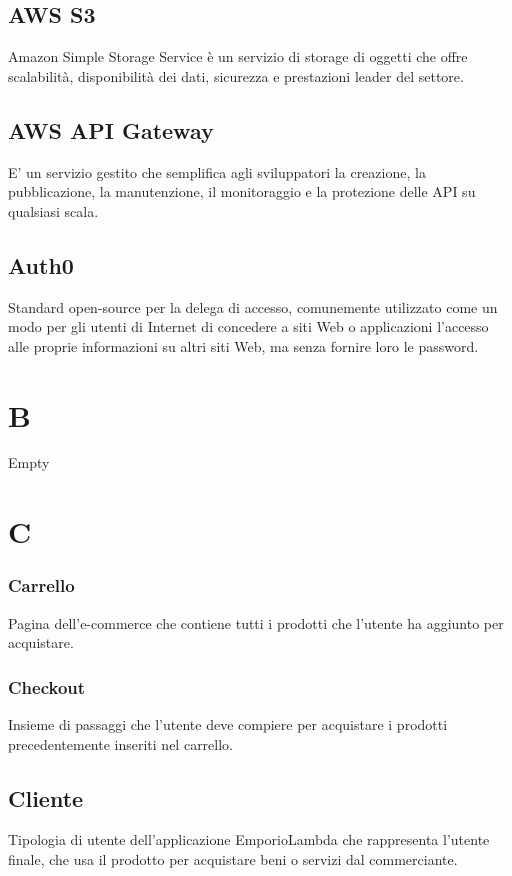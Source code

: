 \subsection*{AWS S3}
Amazon Simple Storage Service è un servizio di storage di oggetti che offre scalabilità, disponibilità dei dati, sicurezza e prestazioni leader del settore.

\subsection*{AWS API Gateway}
E' un servizio gestito che semplifica agli sviluppatori la creazione, la pubblicazione, la manutenzione, il monitoraggio e la protezione delle API su qualsiasi scala.

\subsection*{Auth0}
Standard open-source per la delega di accesso, comunemente utilizzato come un modo per gli utenti di Internet di concedere a siti Web o applicazioni l'accesso alle proprie informazioni su altri siti Web, ma senza fornire loro le password.

\section*{B}
Empty

\section*{C}
\subsubsection*{Carrello}
Pagina dell'e-commerce che contiene tutti i prodotti che l'utente ha aggiunto per acquistare.

\subsubsection*{Checkout}
Insieme di passaggi che l'utente deve compiere per acquistare i prodotti precedentemente inseriti nel carrello.

\subsection*{Cliente}
Tipologia di utente dell'applicazione EmporioLambda che rappresenta l'utente finale, che usa
il prodotto per acquistare beni o servizi dal commerciante.

